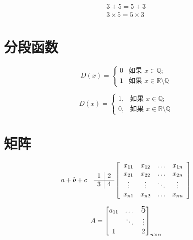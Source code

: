 \documentclass{article}
\begin{document}
    \begin{gather*}
    3+5=5+3 \\
    3 \times 5 = 5 \times 3
    \end{gather*}


    \section{分段函数}
    
    $$
    D(x) = \left\{
    \begin{array}{ll}
    {0} & \text{如果 } x \in \mathbb{Q}; \\ 
    {1} & \text{如果 } x \in \mathbb{R} \setminus \mathbb{Q}
    \end{array}\right.
    $$

    \begin{equation}
    D(x) = \begin{cases}
    1, & \text{如果 } x \in \mathbb{Q}; \\
    0, & \text{如果 } x \in \mathbb{R} \setminus \mathbb{Q}
    \end{cases}
    \end{equation}


    \section{矩阵}
    \[
    a + b \\ + c\quad %
    \begin{array}{l | l}
    {1} & {2} \\ 
    \hline
    {3} & {4}
    \end{array} 
    \left[\begin{array}{cccc}
    {x_{11}} & {x_{12}} & {\dots} & {x_{1 n}} \\ 
    {x_{21}} & {x_{22}} & {\dots} & {x_{2 n}} \\ 
    {\vdots} & {\vdots} & {\ddots} & {\vdots} \\ 
    {x_{n 1}} & {x_{n 2}} & {\dots} & {x_{n n}}
    \end{array}\right]
    \]

    \[
    A = \begin{bmatrix}
        a_{11} & \dots & \text{\Large5}\\ %
        & \ddots  & \vdots \\ %
        1 &  & 2    
    \end{bmatrix}_{n \times n} %
    \]
\end{document}
